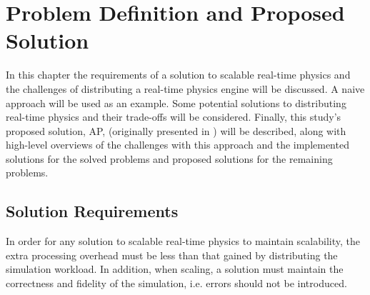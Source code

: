 \chapter{Problem Definition and Proposed Solution}\label{ProbDef}

In this chapter the requirements of a solution to scalable real-time physics and the challenges of distributing a real-time physics engine will be discussed. A naive approach will be used as an example. Some potential solutions to distributing real-time physics and their trade-offs will be considered. Finally, this study's proposed solution, AP, (originally presented in \cite{brown2019aura}) will be described, along with high-level overviews of the challenges with this approach and the implemented solutions for the solved problems and proposed solutions for the remaining problems.

\section{Solution Requirements}

In order for any solution to scalable real-time physics to maintain scalability, the extra processing overhead must be less than that gained by distributing the simulation workload. In addition, when scaling, a solution must maintain the correctness and fidelity of the simulation, i.e. errors should not be introduced.

